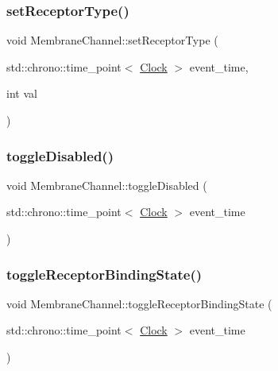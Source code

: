 \mbox{\label{classMembraneChannel_a7f40594845bb0aa6a03fd9c08a836d7e}} 
\subsubsection{\texorpdfstring{set\+Receptor\+Type()}{setReceptorType()}}
{\footnotesize\ttfamily void Membrane\+Channel\+::set\+Receptor\+Type (\begin{DoxyParamCaption}\item[{std\+::chrono\+::time\+\_\+point$<$ \mbox{\hyperlink{universe_8h_a0ef8d951d1ca5ab3cfaf7ab4c7a6fd80}{Clock}} $>$}]{event\+\_\+time,  }\item[{int}]{val }\end{DoxyParamCaption})\hspace{0.3cm}{\ttfamily [inline]}}

\mbox{\label{classMembraneChannel_aabbadec31782704dd497848154dfe0fc}} 
\subsubsection{\texorpdfstring{toggle\+Disabled()}{toggleDisabled()}}
{\footnotesize\ttfamily void Membrane\+Channel\+::toggle\+Disabled (\begin{DoxyParamCaption}\item[{std\+::chrono\+::time\+\_\+point$<$ \mbox{\hyperlink{universe_8h_a0ef8d951d1ca5ab3cfaf7ab4c7a6fd80}{Clock}} $>$}]{event\+\_\+time }\end{DoxyParamCaption})\hspace{0.3cm}{\ttfamily [inline]}}

\mbox{\label{classMembraneChannel_a289ec477e64eec5d2a1f88f4a677650c}} 
\subsubsection{\texorpdfstring{toggle\+Receptor\+Binding\+State()}{toggleReceptorBindingState()}}
{\footnotesize\ttfamily void Membrane\+Channel\+::toggle\+Receptor\+Binding\+State (\begin{DoxyParamCaption}\item[{std\+::chrono\+::time\+\_\+point$<$ \mbox{\hyperlink{universe_8h_a0ef8d951d1ca5ab3cfaf7ab4c7a6fd80}{Clock}} $>$}]{event\+\_\+time }\end{DoxyParamCaption})\hspace{0.3cm}{\ttfamily [inline]}}

